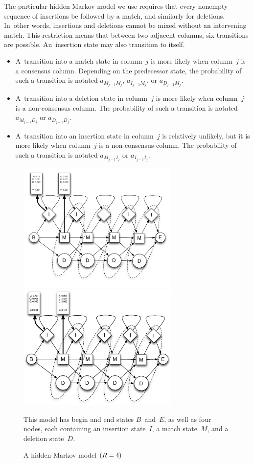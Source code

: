 \documentclass[preprint,nonatbib,blockstyle,nocopyrightspace,times]{sigplanconf}
\newcommand\txprobj[3][]{a#1_{#2_{j-1}#3_j}}
\newcommand\txprobjj[3][]{a#1_{#2_{j-1}#3_j}}
\newcommand\alignwidth{\ensuremath R} %
\begin{document}
The particular hidden Markov model we use requires that every nonempty
sequence of insertions be followed by a match, and similarly for
deletions.
In~other words, insertions and deletions cannot be mixed without an
intervening match.
This restriction means that between two adjacent columns, six
transitions are possible.
An~insertion state may also transition to itself.
\begin{itemize} 
\item
A~transition into a match state in
column~$j$ is more likely when column~$j$ is a consensus column.
Depending on the predecessor state, 
the probability of such a transition is notated
$\txprobj M M$, $\txprobj I M$, or $\txprobj D M$.
\item
A~transition into a deletion state in
 column~$j$ is more likely when column~$j$ is a non-consensus column.
The probability of such a transition is notated
$\txprobj M D$ or $\txprobj D D$.
\item
A~transition into an insertion state in
 column~$j$ is relatively unlikely,
but it is more likely when column~$j$ is a non-consensus column.
The probability of such a transition is notated
$\txprobjj M I$ or $\txprobjj I I$.
\end{itemize}



\begin{figure} 
\ifpdfmadness
\centerline{\includegraphics[width=8cm]{Plan7.pdf}} 
\else
\centerline{\includegraphics[width=8cm]{Plan7.eps}} 
\fi


This model
has begin and end states $B$~and~$E$,
as well as four
nodes, each containing 
an insertion state~$I$, 
a match state~$M$, and a
deletion state~$D$.

\caption{A hidden Markov model $(\alignwidth = 4)$}

\label{plan7} \end{figure}
\end{document}
